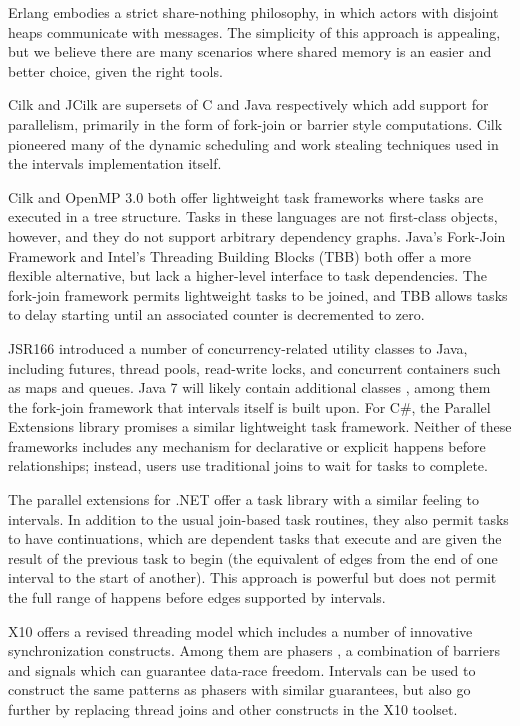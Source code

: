 Erlang \cite{Erlang2010} embodies a strict share-nothing philosophy,
in which actors with disjoint heaps communicate with messages. The
simplicity of this approach is appealing, but we believe there are
many scenarios where shared memory is an easier and better choice,
given the right tools.

Cilk \cite{Blumofe1995, Frigo1998} and JCilk \cite{Danaher2005} are
supersets of C and Java respectively which add support for
parallelism, primarily in the form of fork-join or barrier style
computations. Cilk pioneered many of the dynamic scheduling and work
stealing techniques used in the intervals implementation itself.

Cilk \cite{Blumofe1995, Frigo1998} and OpenMP 3.0 \cite{OpenMP2008}
both offer lightweight task frameworks where tasks are executed in a
tree structure.  Tasks in these languages are not first-class objects,
however, and they do not support arbitrary dependency graphs. Java's
Fork-Join Framework \cite{Lea2006, Lea2000, Lea2000a} and Intel's
Threading Building Blocks (TBB) \cite{Reinders2007, Contreras2008}
both offer a more flexible alternative, but lack a higher-level
interface to task dependencies. The fork-join framework permits
lightweight tasks to be joined, and TBB allows tasks to delay starting
until an associated counter is decremented to zero.

JSR166 \cite{Lea2004} introduced a number of concurrency-related
utility classes to Java, including futures, thread pools, read-write
locks, and concurrent containers such as maps and queues. Java 7 will
likely contain additional classes \cite{Lea2006}, among them the
fork-join framework that intervals itself is built upon. For C\#, the
Parallel Extensions \cite{Leijen2009} library promises a similar
lightweight task framework.  Neither of these frameworks includes any
mechanism for declarative or explicit happens before relationships;
instead, users use traditional joins to wait for tasks to complete.

The parallel extensions for .NET \cite{Leijen2009} offer a task
library with a similar feeling to intervals. In addition to the usual
join-based task routines, they also permit tasks to have
continuations, which are dependent tasks that execute and are given
the result of the previous task to begin (the equivalent of edges from
the end of one interval to the start of another). This approach is
powerful but does not permit the full range of happens before edges
supported by intervals.

X10 \cite{Charles2005, Saraswat2010} offers a revised threading model
which includes a number of innovative synchronization
constructs. Among them are phasers \cite{Shirako2008, Shirako2010}, a
combination of barriers and signals which can guarantee data-race
freedom. Intervals can be used to construct the same patterns as
phasers with similar guarantees, but also go further by replacing
thread joins and other constructs in the X10 toolset.

